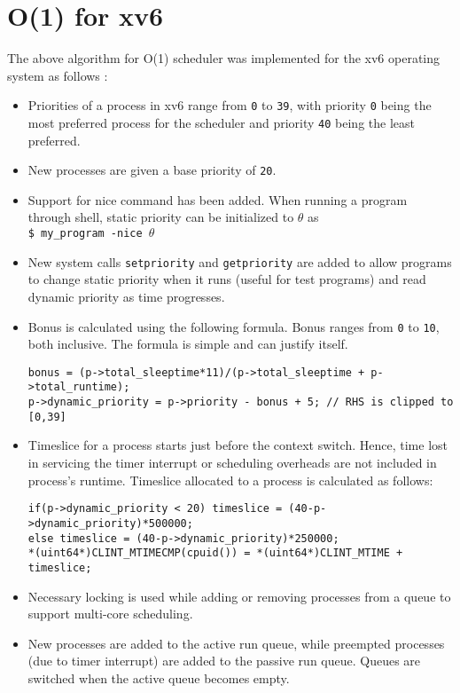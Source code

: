 \documentclass[11pt]{article}
\begin{document}
\section{O(1) for xv6}
\hspace{10mm} The above algorithm for O(1) scheduler was implemented for the xv6 operating system as follows :\\
\begin{itemize}
    \item Priorities of a process in xv6 range from \texttt{0} to \texttt{39}, with priority \texttt{0} being the most preferred process for the scheduler and priority \texttt{40} being the least preferred.
    \item New processes are given a base priority of \texttt{20}.
    \item Support for nice command has been added. When running a program through shell, static priority can be initialized to $\theta$ as\\ \texttt{\$ my\_program -nice \boldmath$\theta$}
    \item New system calls \texttt{setpriority} and \texttt{getpriority} are added to allow programs to change static priority when it runs (useful for test programs) and read dynamic priority as time progresses.
    \item Bonus is calculated using the following formula. Bonus ranges from \texttt{0} to \texttt{10}, both inclusive. The formula is simple and can justify itself.\\
    \begin{verbatim}
bonus = (p->total_sleeptime*11)/(p->total_sleeptime + p->total_runtime);
p->dynamic_priority = p->priority - bonus + 5; // RHS is clipped to [0,39]
    \end{verbatim}
    \item Timeslice for a process starts just before the context switch. Hence, time lost in servicing the timer interrupt or scheduling overheads are not included in process's runtime. Timeslice allocated to a process is calculated as follows:
    \begin{verbatim}
if(p->dynamic_priority < 20) timeslice = (40-p->dynamic_priority)*500000;
else timeslice = (40-p->dynamic_priority)*250000;
*(uint64*)CLINT_MTIMECMP(cpuid()) = *(uint64*)CLINT_MTIME + timeslice;
    \end{verbatim}
    \item Necessary locking is used while adding or removing processes from a queue to support multi-core scheduling.
    \item New processes are added to the active run queue, while preempted processes (due to timer interrupt) are added to the passive run queue. Queues are switched when the active queue becomes empty.
\end{itemize}
\end{document}
